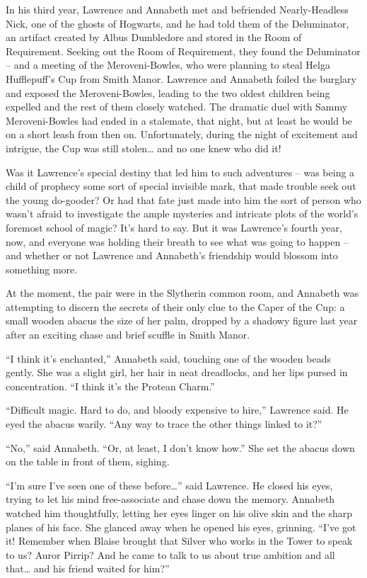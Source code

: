In his third year, Lawrence and Annabeth met and befriended
Nearly-Headless Nick, one of the ghosts of Hogwarts, and he had told
them of the Deluminator, an artifact created by Albus Dumbledore and
stored in the Room of Requirement. Seeking out the Room of Requirement,
they found the Deluminator -- and a meeting of the Meroveni-Bowles, who
were planning to steal Helga Hufflepuff's Cup from Smith Manor. Lawrence
and Annabeth foiled the burglary and exposed the Meroveni-Bowles,
leading to the two oldest children being expelled and the rest of them
closely watched. The dramatic duel with Sammy Meroveni-Bowles had ended
in a stalemate, that night, but at least he would be on a short leash
from then on. Unfortunately, during the night of excitement and
intrigue, the Cup was still stolen\ldots{} and no one knew who did it!

Was it Lawrence's special destiny that led him to such adventures -- was
being a child of prophecy some sort of special invisible mark, that made
trouble seek out the young do-gooder? Or had that fate just made into
him the sort of person who wasn't afraid to investigate the ample
mysteries and intricate plots of the world's foremost school of magic?
It's hard to say. But it was Lawrence's fourth year, now, and everyone
was holding their breath to see what was going to happen -- and whether
or not Lawrence and Annabeth's friendship would blossom into something
more.

At the moment, the pair were in the Slytherin common room, and Annabeth
was attempting to discern the secrets of their only clue to the Caper of
the Cup: a small wooden abacus the size of her palm, dropped by a
shadowy figure last year after an exciting chase and brief scuffle in
Smith Manor.

``I think it's enchanted,'' Annabeth said, touching one of the wooden
beads gently. She was a slight girl, her hair in neat dreadlocks, and
her lips pursed in concentration. ``I think it's the Protean Charm.''

``Difficult magic. Hard to do, and bloody expensive to hire,'' Lawrence
said. He eyed the abacus warily. ``Any way to trace the other things
linked to it?''

``No,'' said Annabeth. ``Or, at least, I don't know how.'' She set the
abacus down on the table in front of them, sighing.

``I'm sure I've seen one of these before\ldots{}'' said Lawrence. He
closed his eyes, trying to let his mind free-associate and chase down
the memory. Annabeth watched him thoughtfully, letting her eyes linger
on his olive skin and the sharp planes of his face. She glanced away
when he opened his eyes, grinning. ``I've got it! Remember when Blaise
brought that Silver who works in the Tower to speak to us? Auror Pirrip?
And he came to talk to us about true ambition and all that\ldots{} and
his friend waited for him?''

